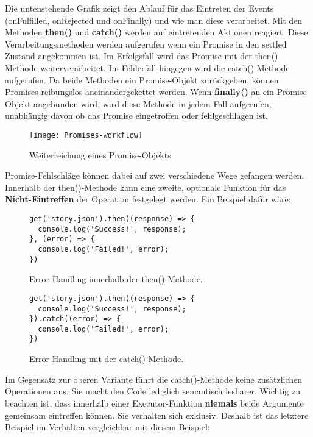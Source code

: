\noindent
Die untenstehende Grafik zeigt den Ablauf für das Eintreten der Events (onFulfilled, onRejected und onFinally) und wie man diese verarbeitet. Mit den Methoden \textbf{then()} und \textbf{catch()} werden auf eintretenden Aktionen reagiert. Diese Verarbeitungsmethoden werden aufgerufen wenn ein Promise in den settled Zustand angekommen ist. Im Erfolgsfall wird das Promise mit der then() Methode weiterverarbeitet. Im Fehlerfall hingegen wird die catch() Methode aufgerufen. Da beide Methoden ein Promise-Objekt zurückgeben, können Promises reibungslos aneinandergekettet werden. Wenn \textbf{finally()} an ein Promise Objekt angebunden wird, wird diese Methode in jedem Fall aufgerufen, unabhängig davon ob das Promise eingetroffen oder fehlgeschlagen ist.

\begin{figure}[H]
\texttt{[image: Promises-workflow]}
\caption{Weiterreichung eines Promise-Objekts \cite{promise-executor}}
\end{figure}

\noindent
Promise-Fehlschläge können dabei auf zwei verschiedene Wege gefangen werden. Innerhalb der then()-Methode kann eine zweite, optionale Funktion für das \textbf{Nicht-Eintreffen} der Operation festgelegt werden. Ein Beispiel dafür wäre:

\begin{figure}[H]
\begin{lstlisting}[basicstyle=\small]
get('story.json').then((response) => {
  console.log('Success!', response);
}, (error) => {
  console.log('Failed!', error);
})
\end{lstlisting}
\caption{Error-Handling innerhalb der then()-Methode. \cite{callback-vs-promises}}
\end{figure}

\begin{figure}[H]
\begin{lstlisting}[basicstyle=\small]
get('story.json').then((response) => {
  console.log('Success!', response);
}).catch((error) => {
  console.log('Failed!', error);
})
\end{lstlisting}
\caption{Error-Handling mit der catch()-Methode. \cite{callback-vs-promises}}
\end{figure}

\noindent
Im Gegensatz zur oberen Variante führt die catch()-Methode keine zusätzlichen Operationen aus. Sie macht den Code lediglich semantisch lesbarer. Wichtig zu beachten ist, dass innerhalb einer Executor-Funktion \textbf{niemals} beide Argumente gemeinsam eintreffen können. Sie verhalten sich exklusiv. Deshalb ist das letztere Beispiel im Verhalten vergleichbar mit diesem Beispiel:

